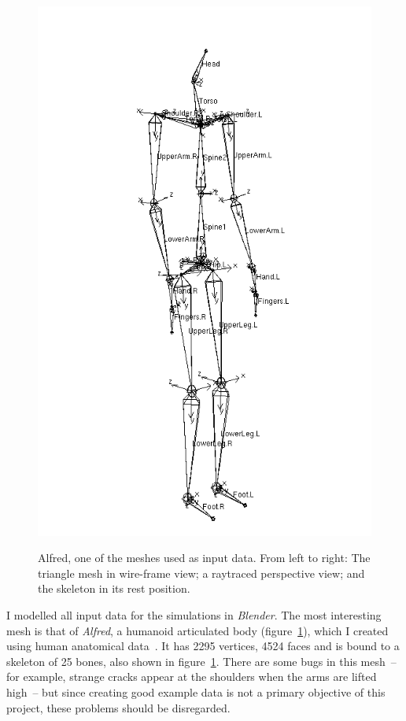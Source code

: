 \begin{figure}
{    \includegraphics{figures/alfred-skeleton}}
\caption{Alfred, one of the meshes used as input data. From left to right: The triangle mesh in
    wire-frame view; a raytraced perspective view; and the skeleton in its rest position.
    \label{alfredFigure}}
\end{figure}
I modelled all input data for the simulations in \textsl{Blender}. The most interesting mesh
is that of \emph{Alfred}, a humanoid articulated body (figure~\ref{alfredFigure}), which I created
using human anatomical data~\cite{Anatomy:03}. It has 2295 vertices, 4524 faces and is bound to
a skeleton of 25 bones, also shown in figure~\ref{alfredFigure}. There are some bugs in this
mesh~-- for example, strange cracks appear at the shoulders when the arms are lifted high~-- but
since creating good example data is not a primary objective of this project, these problems
should be disregarded.

